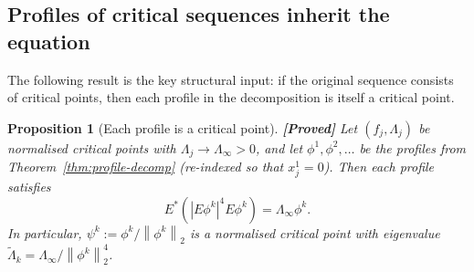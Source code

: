 \documentclass[12pt]{article}
\newtheorem{proposition}[theorem]{Proposition}
\theoremstyle{definition}
\theoremstyle{remark}
\newcommand{\norm}[1]{\left\|#1\right\|}
\newcommand{\proven}{\textbf{\color{teal}[Proved]}}
\begin{document}
\subsection{Profiles of critical sequences inherit the equation}

The following result is the key structural input: if the original
sequence consists of critical points, then each profile in the
decomposition is itself a critical point.

\begin{proposition}[Each profile is a critical point]
  \label{prop:profile-critical}
  \proven\quad
  Let $(f_j,\Lambda_j)$ be normalised critical points with
  $\Lambda_j\to\Lambda_\infty>0$, and let $\phi^1,\phi^2,\ldots$
  be the profiles from Theorem~\ref{thm:profile-decomp} (re-indexed
  so that $x_j^1=0$).  Then each profile satisfies
  \begin{equation}\label{eq:profile-EL}
    E^*(|E\phi^k|^4E\phi^k) = \Lambda_\infty\phi^k.
  \end{equation}
  In particular, $\psi^k:=\phi^k/\norm{\phi^k}_2$ is a normalised
  critical point with eigenvalue
  $\widetilde\Lambda_k=\Lambda_\infty/\norm{\phi^k}_2^4$.
\end{proposition}
\end{document}
